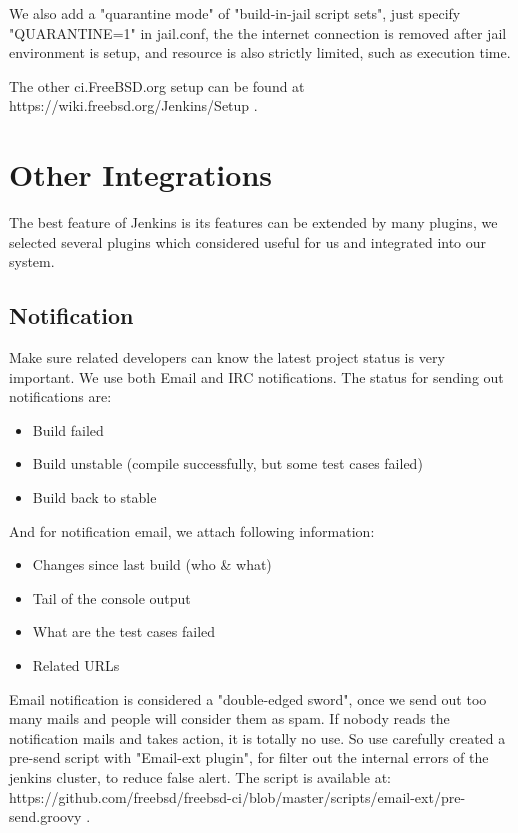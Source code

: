 \documentclass[a4paper,twocolumn,10pt]{article}
\begin{document}
We also add a "quarantine mode" of "build-in-jail script sets", just specify
"QUARANTINE=1" in jail.conf, the the internet connection is removed after jail
environment is setup, and resource is also strictly limited, such as execution
time.

The other ci.FreeBSD.org setup can be found at
https://wiki.freebsd.org/Jenkins/Setup .

\section{Other Integrations}

The best feature of Jenkins is its features can be extended by many plugins, we
selected several plugins which considered useful for us and integrated into our
system.

\subsection{Notification}

Make sure related developers can know the latest project status is very
important. We use both Email and IRC notifications. The status for sending out
notifications are:

\begin{itemize}
\item Build failed
\item Build unstable (compile successfully, but some test cases failed)
\item Build back to stable
\end{itemize}

And for notification email, we attach following information:
\begin{itemize}
\item Changes since last build (who \& what)
\item Tail of the console output
\item What are the test cases failed
\item Related URLs
\end{itemize}

Email notification is considered a "double-edged sword", once we send out too
many mails and people will consider them as spam. If nobody reads the
notification mails and takes action, it is totally no use. So use carefully
created a pre-send script with "Email-ext plugin", for filter out the internal
errors of the jenkins cluster, to reduce false alert. The script is available
at:
https://github.com/freebsd/freebsd-ci/blob/master/scripts/email-ext/pre-send.groovy
.
\end{document}
